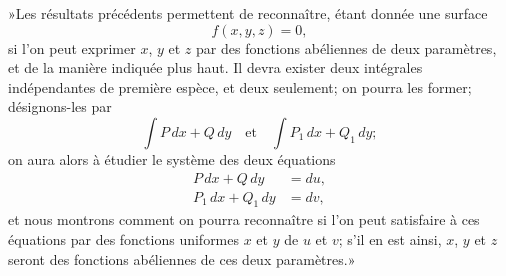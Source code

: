 \documentclass{article}
\begin{document}
»Les résultats précédents permettent de reconnaître, étant donnée une surface
\[
f(x, y, z) = 0,
\]
si l'on peut exprimer $x$, $y$ et $z$ par des fonctions abéliennes de deux paramètres, et de la manière indiquée plus haut. Il devra exister deux intégrales indépendantes de première espèce, et deux seulement; on pourra les former; désignons-les par
\[
\int P\,dx + Q\,dy \quad\text{et}\quad \int P_{1}\,dx + Q_{1}\,dy;
\]
on aura alors à étudier le système des deux équations
\[
\begin{aligned}
P\,dx + Q\,dy &= du, \\
P_{1}\,dx + Q_{1}\,dy &= dv,
\end{aligned}
\]
et nous montrons comment on pourra reconnaître si l'on peut satisfaire à ces équations par des fonctions uniformes $x$ et $y$ de $u$ et $v$; s'il en est ainsi, $x$, $y$ et $z$ seront des fonctions abéliennes de ces deux paramètres.»
\end{document}
